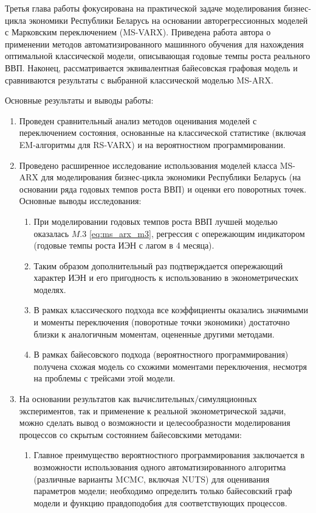 \documentclass[a4paper,14pt]{extreport}
\begin{document}
Третья глава работы фокусирована на практической задаче моделирования бизнес-цикла экономики Республики Беларусь на основании авторегрессионных моделей с Марковским переключением (MS-VARX). Приведена работа автора о применении методов автоматизированного машинного обучения для нахождения оптимальной классической модели, описывающая годовые темпы роста реального ВВП. Наконец, рассматривается эквивалентная байесовская графовая модель и сравниваются результаты с выбранной классической моделью MS-ARX.


Основные результаты и выводы работы:

\begin{enumerate}
	\item Проведен сравнительный анализ методов оценивания моделей с переключением состояния, основанные на классической статистике (включая EM-алгоритмы для RS-VARX) и на вероятностном программировании.
	\item Проведено расширенное исследование использования моделей класса MS-ARX для моделирования бизнес-цикла экономики Республики Беларусь (на основании ряда годовых темпов роста ВВП) и оценки его поворотных точек. Основные выводы исследования:
	      \begin{enumerate}
		      \item При моделировании годовых темпов роста ВВП лучшей моделью оказалась $M.3$ \eqref{eq:ms_arx_m3}, регрессия с опережающим индикатором (годовые темпы роста ИЭН с лагом в 4 месяца).
		      \item Таким образом дополнительный раз подтверждается опережающий характер ИЭН и его пригодность к использованию в эконометрических моделях.
		      \item В рамках классического подхода все коэффициенты оказались значимыми и моменты переключения (поворотные точки экономики) достаточно близки к аналогичным моментам, оцененные другими методами.
		      \item В рамках байесовского подхода (вероятностного программирования) получена схожая модель со схожими моментами переключения, несмотря на проблемы с трейсами этой модели.
	      \end{enumerate}
	\item На основании результатов как вычислительных/симуляционных экспериментов, так и применение к реальной эконометрической задачи, можно сделать вывод о возможности и целесообразности моделирования процессов со скрытым состоянием байесовскими методами:
	      \begin{enumerate}
		      \item Главное преимущество вероятностного программирования заключается в возможности использования одного автоматизированного алгоритма (различные варианты MCMC, включая NUTS) для оценивания параметров модели; необходимо определить только байесовский граф модели и функцию правдоподобия для соответствующих процессов.

\end{enumerate}
\end{enumerate}
\end{document}

